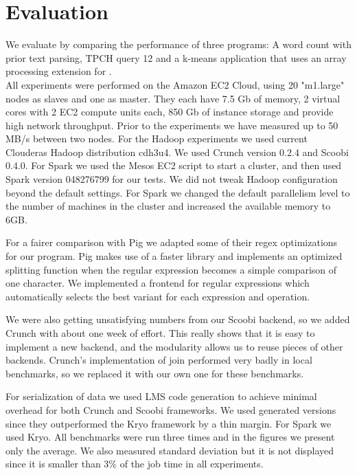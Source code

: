 \section{Evaluation}
\label{sec:evaluation}


We evaluate \tool by comparing the performance of three programs: A word count with prior text parsing, TPCH query 12 and a k-means application that uses an array processing extension for \tool. \\

All experiments were performed on the Amazon EC2 Cloud, using 20 "m1.large" nodes as slaves and one as master. They each have 7.5 Gb of memory, 2 virtual cores with 2 EC2 compute units each, 850 Gb of instance storage and provide high network throughput. Prior to the experiments we have measured up to 50 MB/s between two nodes. For the Hadoop experiments we used current Clouderas Hadoop distribution cdh3u4. We used Crunch version 0.2.4 and Scoobi 0.4.0. For Spark we used the Mesos  EC2 script to start a cluster, and then used Spark version 048276799 for our tests. We did not tweak Hadoop configuration beyond the default settings. For Spark we changed the default parallelism level to the number of machines in the cluster and increased the available memory to 6GB. 

For a fairer comparison with Pig we adapted some of their regex optimizations for our program. Pig makes use of a faster library  and implements an optimized splitting function when the regular expression becomes a simple comparison of one character. We implemented a frontend for regular expressions which automatically selects the best variant for each expression and operation. 

We were also getting unsatisfying numbers from our Scoobi backend, so we added Crunch with about one week of effort. This really shows that it is easy to implement a new backend, and the modularity allows us to reuse pieces of other backends. Crunch's implementation of join performed very badly in local benchmarks, so we replaced it with our own one for these benchmarks.

For serialization of data we used LMS code generation to achieve minimal overhead for both Crunch and Scoobi frameworks. We used generated versions since they outperformed the Kryo framework by a thin margin. For Spark we used Kryo. All benchmarks were run three times and in the figures we present only the average. We also measured standard deviation but it is not displayed since it is smaller than 3\% of the job time in all experiments.


